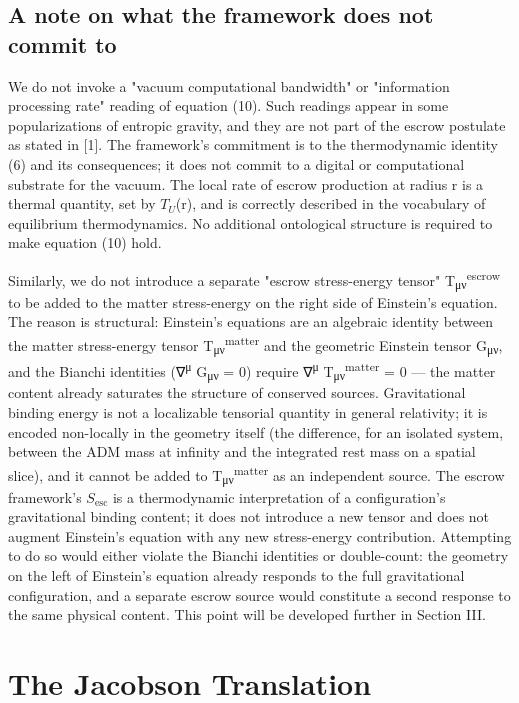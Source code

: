 \documentclass[11pt]{article}
\begin{document}
\subsection{A note on what the framework does not commit to}

We do not invoke a "vacuum computational bandwidth" or "information
processing rate" reading of equation (10). Such readings appear in some
popularizations of entropic gravity, and they are not part of the escrow
postulate as stated in [1]. The framework's commitment is to the
thermodynamic identity (6) and its consequences; it does not commit to a
digital or computational substrate for the vacuum. The local rate of
escrow production at radius r is a thermal quantity, set by $T_{U}$(r), and
is correctly described in the vocabulary of equilibrium thermodynamics.
No additional ontological structure is required to make equation (10)
hold.

Similarly, we do not introduce a separate "escrow stress-energy
tensor" T\textsubscript{μν}\textsuperscript{escrow} to be added to the matter stress-energy on the
right side of Einstein's equation. The reason is structural:
Einstein's equations are an algebraic identity between the matter
stress-energy tensor T\textsubscript{μν}\textsuperscript{matter} and the geometric Einstein tensor
G\textsubscript{μν}, and the Bianchi identities (∇\textsuperscript{μ} G\textsubscript{μν} = 0) require ∇\textsuperscript{μ}
T\textsubscript{μν}\textsuperscript{matter} = 0 --- the matter content already saturates the structure
of conserved sources. Gravitational binding energy is not a localizable
tensorial quantity in general relativity; it is encoded non-locally in
the geometry itself (the difference, for an isolated system, between the
ADM mass at infinity and the integrated rest mass on a spatial slice),
and it cannot be added to T\textsubscript{μν}\textsuperscript{matter} as an independent source. The
escrow framework's $S_{\mathrm{esc}}$ is a thermodynamic interpretation of a
configuration's gravitational binding content; it does not introduce a
new tensor and does not augment Einstein's equation with any new
stress-energy contribution. Attempting to do so would either violate the
Bianchi identities or double-count: the geometry on the left of
Einstein's equation already responds to the full gravitational
configuration, and a separate escrow source would constitute a second
response to the same physical content. This point will be developed
further in Section III.


\section{The Jacobson Translation}
\end{document}
